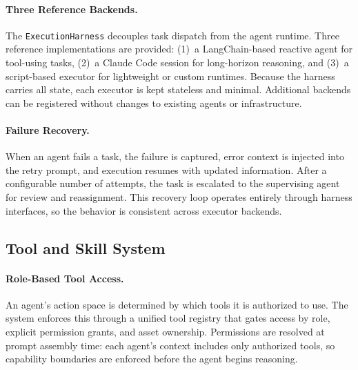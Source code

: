 \paragraph{Three Reference Backends.}
The \texttt{ExecutionHarness} decouples task dispatch from the agent runtime. Three reference implementations are provided: (1)~a LangChain-based reactive agent for tool-using tasks, (2)~a Claude Code session for long-horizon reasoning, and (3)~a script-based executor for lightweight or custom runtimes. Because the harness carries all state, each executor is kept stateless and minimal. Additional backends can be registered without changes to existing agents or infrastructure.

\paragraph{Failure Recovery.}
When an agent fails a task, the failure is captured, error context is injected into the retry prompt, and execution resumes with updated information. After a configurable number of attempts, the task is escalated to the supervising agent for review and reassignment. This recovery loop operates entirely through harness interfaces, so the behavior is consistent across executor backends.

\subsection{Tool and Skill System}
\label{sec:tools}

\paragraph{Role-Based Tool Access.}
An agent's action space is determined by which tools it is authorized to use. The system enforces this through a unified tool registry that gates access by role, explicit permission grants, and asset ownership. Permissions are resolved at prompt assembly time: each agent's context includes only authorized tools, so capability boundaries are enforced before the agent begins reasoning.

